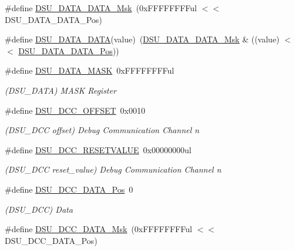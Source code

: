 \begin{DoxyCompactItemize}
\#define \mbox{\hyperlink{group___s_a_m_d21___d_s_u_ga23b8e4cde6cb91cf05bb65a48c1250c2}{D\+S\+U\+\_\+\+D\+A\+T\+A\+\_\+\+D\+A\+T\+A\+\_\+\+Msk}}~(0x\+F\+F\+F\+F\+F\+F\+F\+Ful $<$$<$ D\+S\+U\+\_\+\+D\+A\+T\+A\+\_\+\+D\+A\+T\+A\+\_\+\+Pos)
\item 
\#define \mbox{\hyperlink{group___s_a_m_d21___d_s_u_gaeb9ece8dc9d2857876bb710844551cda}{D\+S\+U\+\_\+\+D\+A\+T\+A\+\_\+\+D\+A\+TA}}(value)~(\mbox{\hyperlink{group___s_a_m_d21___d_s_u_ga23b8e4cde6cb91cf05bb65a48c1250c2}{D\+S\+U\+\_\+\+D\+A\+T\+A\+\_\+\+D\+A\+T\+A\+\_\+\+Msk}} \& ((value) $<$$<$ \mbox{\hyperlink{group___s_a_m_d21___d_s_u_ga035409bf73a654618f87c65e2742bc35}{D\+S\+U\+\_\+\+D\+A\+T\+A\+\_\+\+D\+A\+T\+A\+\_\+\+Pos}}))
\item 
\#define \mbox{\hyperlink{group___s_a_m_d21___d_s_u_ga8ef0cc4d206f8b748482d8f40d4743e5}{D\+S\+U\+\_\+\+D\+A\+T\+A\+\_\+\+M\+A\+SK}}~0x\+F\+F\+F\+F\+F\+F\+F\+Ful
\begin{DoxyCompactList}\small\item\em (D\+S\+U\+\_\+\+D\+A\+TA) M\+A\+SK Register \end{DoxyCompactList}\item 
\#define \mbox{\hyperlink{group___s_a_m_d21___d_s_u_ga79bf45c7c66b3d6ce28c7c9f9e6b3b89}{D\+S\+U\+\_\+\+D\+C\+C\+\_\+\+O\+F\+F\+S\+ET}}~0x0010
\begin{DoxyCompactList}\small\item\em (D\+S\+U\+\_\+\+D\+CC offset) Debug Communication Channel n \end{DoxyCompactList}\item 
\#define \mbox{\hyperlink{group___s_a_m_d21___d_s_u_gaf005efb1f6ed05574d398463365093b8}{D\+S\+U\+\_\+\+D\+C\+C\+\_\+\+R\+E\+S\+E\+T\+V\+A\+L\+UE}}~0x00000000ul
\begin{DoxyCompactList}\small\item\em (D\+S\+U\+\_\+\+D\+CC reset\+\_\+value) Debug Communication Channel n \end{DoxyCompactList}\item 
\#define \mbox{\hyperlink{group___s_a_m_d21___d_s_u_ga5d96d9ba36151557c8211afc631280c6}{D\+S\+U\+\_\+\+D\+C\+C\+\_\+\+D\+A\+T\+A\+\_\+\+Pos}}~0
\begin{DoxyCompactList}\small\item\em (D\+S\+U\+\_\+\+D\+CC) Data \end{DoxyCompactList}\item 
\#define \mbox{\hyperlink{group___s_a_m_d21___d_s_u_ga10a910bf866c48cce4bafb987cdbe360}{D\+S\+U\+\_\+\+D\+C\+C\+\_\+\+D\+A\+T\+A\+\_\+\+Msk}}~(0x\+F\+F\+F\+F\+F\+F\+F\+Ful $<$$<$ D\+S\+U\+\_\+\+D\+C\+C\+\_\+\+D\+A\+T\+A\+\_\+\+Pos)
$$
\end{DoxyCompactItemize}
